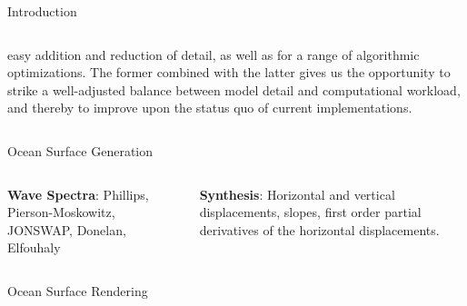 \documentclass[final,hyperref={pdfpagelabels=true}]{beamer}
\begin{document}
\begin{frame}[fragile]
\begin{center}
\begin{minipage}{\textwidth}
\begin{block}{Introduction}
\begin{columns}[t]
\begin{column}{0.45\linewidth}
					easy addition and reduction of detail, as well as for a range of algorithmic
					optimizations. The former combined with the latter gives us the opportunity to
					strike a well-adjusted balance between model detail and computational workload,
					and thereby to improve upon the status quo of current implementations.
				\end{column}	  
			\end{columns}
		\end{block}
	\end{minipage}
	\begin{minipage}{\textwidth}
		\begin{block}{Ocean Surface Generation}	
			\begin{columns}[t]
				\begin{column}{0.45\linewidth}
					\textbf{Wave Spectra}:
					Phillips, Pierson-Moskowitz, JONSWAP, Donelan, Elfouhaly
				\end{column}
				\begin{column}{0.45\linewidth}
					\textbf{Synthesis}:
					Horizontal and vertical displacements, slopes, first order partial derivatives of the horizontal displacements.
				\end{column}	  
			\end{columns}
		\end{block}
	\end{minipage}
	\begin{minipage}{\textwidth}
		\begin{block}{Ocean Surface Rendering}
			\begin{columns}[t]

\end{columns}
\end{block}
\end{minipage}
\end{center}
\end{frame}
\end{document}
